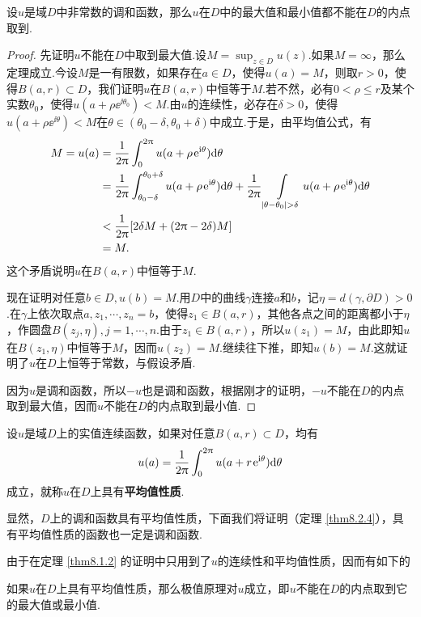 \begin{theorem}\label{thm8.1.2}
设$u$是域$D$中非常数的调和函数，那么$u$在$D$中的最大值和最小值都不能在$D$的内点取到.
\end{theorem}
\begin{proof}
先证明$u$不能在$D$中取到最大值.设$M=\sup_{z\in D}u(z)$.如果$M=\infty$，那么定理成立.今设$M$是一有限数，如果存在$a\in D$，使得$u(a)=M$，则取$r>0$，使得$B(a,r)\subset D$，我们证明$u$在$B(a,r)$中恒等于$M$.若不然，必有$0<\rho\le r$及某个实数$\theta_0$，使得$u(a+\rho\ee^{\ii\theta_0})<M$.由$u$的连续性，必存在$\delta>0$，使得$u(a+\rho\ee^ {\ii\theta})<M$在$\theta\in(\theta_0-\delta,\theta_0+\delta)$中成立.于是，由平均值公式，有
\begin{align*}
M=u(a)&=\frac1{2\pi}\int_0^{2\pi}u(a+\rho\ee^{\ii\theta})\textrm d\theta\\
&=\frac1{2\pi}\int_{\theta_0-\delta}^{\theta_0+\delta}u(a+\rho\ee^{\ii\theta})
\textrm d\theta+\frac1{2\pi}\int\limits_{|\theta-\theta_0|>\delta}
u(a+\rho\ee^ {\ii\theta})\textrm d\theta\\
&<\frac1{2\pi}[2\delta M+(2\pi-2\delta)M]\\
&=M.
\end{align*}
这个矛盾说明$u$在$B(a,r)$中恒等于$M$.

现在证明对任意$b\in D,u(b)=M$.用$D$中的曲线$\gamma$连接$a$和$b$，记$\eta=d(\gamma,\partial D)>0$.在$\gamma$上依次取点$a,z_1,\cdots,z_n=b$，使得$z_1\in B(a,r)$，其他各点之间的距离都小于$\eta$，作圆盘$B(z_j,\eta),j=1,\cdots,n$.由于$z_1\in B(a,r)$，所以$u(z_1)=M$，由此即知$u$在$B(z_1,\eta)$中恒等于$M$，因而$u(z_2)=M$.继续往下推，即知$u(b)=M$.这就证明了$u$在$D$上恒等于常数，与假设矛盾.

因为$u$是调和函数，所以$-u$也是调和函数，根据刚才的证明，$-u$不能在$D$的内点取到最大值，因而$u$不能在$D$的内点取到最小值.
\end{proof}

\begin{definition}\label{def8.1.3}
设$u$是域$D$上的实值连续函数，如果对任意$B(a,r)\subset D$，均有
\[u(a)=\frac1{2\uppi}\int_0^{2\uppi}u(a+r\operatorname{\!\!\;\mathrm e}^{\mathrm i\theta})\textrm d\theta\]
成立，就称$u$在$D$上具有\textbf{平均值性质}.
\end{definition}

显然，$D$上的调和函数具有平均值性质，下面我们将证明（定理 \ref{thm8.2.4}），具有平均值性质的函数也一定是调和函数.

由于在定理 \ref{thm8.1.2} 的证明中只用到了$u$的连续性和平均值性质，因而有如下的
\begin{prop}\label{prop8.1.4}
如果$u$在$D$上具有平均值性质，那么极值原理对$u$成立，即$u$不能在$D$的内点取到它的最大值或最小值.
\end{prop}

